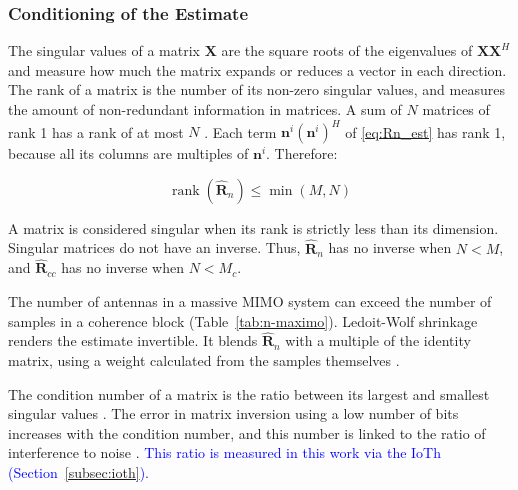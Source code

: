 \subsubsection{Conditioning of the Estimate}\label{subsubsec:condicionamento-R}


The singular values ​​of a matrix $\mathbf X$ are the square roots of the eigenvalues ​​of $\mathbf X\mathbf X^H$ and measure how much the matrix expands or reduces a vector in each direction. The rank of a matrix is ​​the number of its non-zero singular values, and measures the amount of non-redundant information in matrices. A sum of $N$ matrices of rank 1 has a rank of at most $N$ \cite{tse-viswanath}. Each term $\mathbf{n}^i(\mathbf{n}^i)^H$ of \eqref{eq:Rn_est} has rank 1, because all its columns are multiples of $\mathbf{n}^i$. Therefore:

\[
\operatorname{rank}(\widehat{\mathbf R}_n) \leq \min(M,N)
\]

A matrix is ​​considered singular when its rank is strictly less than its dimension. Singular matrices do not have an inverse. Thus, $\widehat{\mathbf R}_n$ has no inverse when $N<M$, and $\hat{\mathbf R}_{cc}$ has no inverse when $N<M_c$.


The number of antennas in a massive MIMO system can exceed the number of samples in a coherence block (Table~\ref{tab:n-maximo}). Ledoit-Wolf shrinkage renders the estimate invertible. It blends $\widehat{\mathbf R}_n$ with a multiple of the identity matrix, using a weight calculated from the samples themselves \cite{ledoit-wolf}.

The condition number of a matrix is ​​the ratio between its largest and smallest singular values ​​\cite{tse-viswanath}. The error in matrix inversion using a low number of bits increases with the condition number, and this number is linked to the ratio of interference to noise \cite{osinsky2023}. \textcolor{blue}{This ratio is measured in this work via the IoTh (Section~\ref{subsec:ioth}).}
